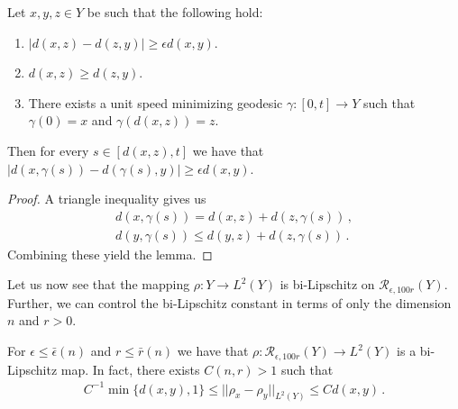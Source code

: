 \documentclass[11pt]{article}
\newcommand{\cR}{\mathcal{R}}
\begin{document}
\begin{lemma}\label{l:reverse_triangle}
 Let $x,y,z\in Y$ be such that the following hold:
\begin{enumerate}
 \item $|d(x,z)-d(z,y)|\geq\epsilon d(x,y)$.
 \item $d(x,z)\geq d(z,y)$.
 \item There exists a unit speed minimizing geodesic $\gamma:[0,t]\rightarrow Y$ such that $\gamma(0)=x$ and $\gamma(d(x,z))=z$.
\end{enumerate}
Then for every $s\in [d(x,z),t]$ we have that $|d(x,\gamma(s))-d(\gamma(s),y)|\geq\epsilon d(x,y)$.
\end{lemma}
\begin{proof}
 A triangle inequality gives us
\begin{align}
 d(x,\gamma(s))=d(x,z)+d(z,\gamma(s))\, ,\\
 d(y,\gamma(s))\leq d(y,z)+d(z,\gamma(s))\, .
\end{align}
Combining these yield the lemma.
\end{proof}


Let us now see that the mapping $\rho:Y\to L^2(Y)$ is bi-Lipschitz on $\cR_{\epsilon,100r}(Y)$.  Further, we can control the bi-Lipschitz constant in terms of only the dimension $n$ and $r>0$.

\begin{lemma}
For $\epsilon\leq \bar\epsilon(n)$ and $r\leq \bar r(n)$ we have that $\rho:\cR_{\epsilon,100r}(Y)\to L^2(Y)$ is a bi-Lipschitz map.  In fact, there exists $C(n,r)>1$ such that
\begin{align}
C^{-1}\min\{d(x,y),1\}\leq ||\rho_x-\rho_y||_{L^2(Y)}\leq C d(x,y)\, .
\end{align}
\end{lemma}
\end{document}
